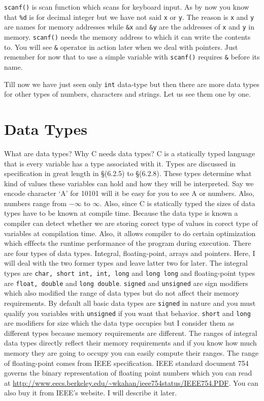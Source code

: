 \texttt{scanf()} is scan function which scans for keyboard input. As by now you
know that \texttt{\%d} is for decimal integer but we have not said \texttt{x}
or \texttt{y}. The reason is \texttt{x} and \texttt{y} are names for memory
addresses while
\texttt{\&x} and \texttt{\&y} are the addresses of \texttt{x} and \texttt{y} in
memory. \texttt{scanf()} needs the memory address to which it can write the
contents to. You will see \texttt{\&} operator in action later when we deal
with pointers. Just remember for now that to use a simple variable with
\texttt{scanf()} requires \texttt{\&} before its name.

Till now we have just seen only \texttt{int} data-type but then there are more
data types for other types of numbers, characters and strings. Let us see them
one by one.

\section{Data Types}
What are data types? Why C needs data types? C is a statically typed language
that is every variable has a type associated with it. Types are discussed in
specification in great length in \S(6.2.5) to \S(6.2.8).
These types determine
what kind of values these variables can hold and how they will be interpreted.
Say we encode
character `A' for 10101 will it be easy for you to see A or numbers. Also,
numbers range from $-\infty$ to $\infty$. Also, since C is statically typed the
sizes of data types have to be known at compile time. Because the data type is
known a compiler can detect whether we are storing corect type of values in
corect type of variables at compilation time. Also, it allows compiler to do
certain optimization which efffects the runtime performance of the program
during execution. There are four types of
data types. Integral, floating-point, arrays and pointers. Here, I will deal
with the two former types and leave latter two for later. The integral types
are \texttt{char, short int, int, long} and \texttt{long long} and
floating-point types are \texttt{float, double} and \texttt{long
  double}. \texttt{signed} and \texttt{unsigned} are sign modifiers which also
modified the range of data types but do not affect their memory
requirements. By default all basic data types are \texttt{signed} in nature and
you must qualify you variables with \texttt{unsigned} if you want that
behavior. \texttt{short} and \texttt{long} are modifiers for size which the
data type occupies but I consider them as different types because memory
requirements are different. The ranges of integral data types directly reflect
their memory requirements and if you know how much memory they are going to
occupy you can easily compute their ranges. The range of floating-point comes
from IEEE specification. IEEE standard document 754 governs the binary
representation of floating point numbers which you can read at
\url{http://www.eecs.berkeley.edu/~wkahan/ieee754status/IEEE754.PDF}. You can
also buy it from IEEE's website. I will describe it later.

